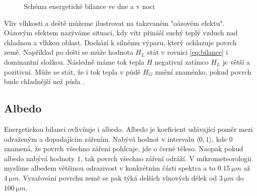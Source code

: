 \begin{figure}
\centering
\caption{Schéma energetické bilance ve dne a v noci}
\label{fig:schema}
\end{figure}

Vliv vlhkosti a deště můžeme ilustrovat na takzvaném "oázovém efektu". Oázovým efektem nazýváme situaci, kdy vítr přináší suchý teplý vzduch nad chladnou a vlhkou oblast. Dochází k silnému výparu, který ochlazuje povrch země. Například po dešti se může hodnota $H_L$ stát v rovnici \eqref{eq:bilance} i dominantní složkou. Následně máme tok tepla $H$ negativní zatímco $H_L$ je větší a pozitivní. Může se stát, že i tok tepla v půdě $H_G$ změní znaménko, pokud povrch bude chladnější než půda \parencite{arya2001}.

\subsection{Albedo}
Energetickou bilanci ovlivňuje i albedo. Albedo je koeficient udávající poměr mezi odraženým a dopadajícím zářením. Nabývá hodnot v intervalu $\langle 0,1\rangle$, kde $0$ znamená, že povrch všechno záření pohlcuje, jde o černé těleso. Naopak pokud albedo nabývá hodnoty $1$, tak povrch všechno záření odráží. V mikrometeorologii myslíme albedem většinou odrazivost v konkrétním části spektra a to $\SI{0.15}{\micro m}$ až $\SI{4}{\micro m}$. Vyzařování povrchu země se pak týká delších vlnových délek od $\SI{3}{\micro m}$ do $\SI{100}{\micro m}$. 

